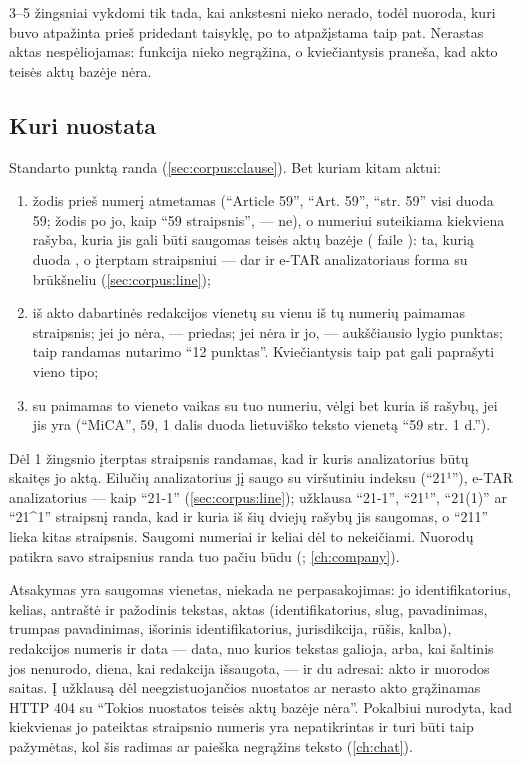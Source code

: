 3--5 žingsniai vykdomi tik tada, kai ankstesni nieko nerado, todėl nuoroda, kuri buvo
atpažinta prieš pridedant taisyklę, po to atpažįstama taip pat. Nerastas aktas nespėliojamas:
funkcija nieko negrąžina, o kviečiantysis praneša, kad akto teisės aktų bazėje nėra.

\subsection{Kuri nuostata}\label{sec:corpus:whichprovision}

Standarto punktą randa  (\cref{sec:corpus:clause}). Bet kuriam kitam aktui:

\begin{enumerate}
  \item žodis prieš numerį atmetamas (\enquote{Article 59}, \enquote{Art. 59},
    \enquote{str. 59} visi duoda 59; žodis po jo, kaip \enquote{59 straipsnis}, --- ne), o
    numeriui suteikiama kiekviena rašyba, kuria jis gali būti saugomas teisės aktų bazėje
    ( faile ): ta, kurią duoda
    , o įterptam straipsniui --- dar ir e-TAR analizatoriaus forma su
    brūkšneliu (\cref{sec:corpus:line});
  \item iš akto dabartinės redakcijos vienetų su vienu iš tų numerių paimamas straipsnis; jei jo nėra,
    --- priedas; jei nėra ir jo, --- aukščiausio lygio punktas; taip randamas nutarimo
    \enquote{12 punktas}. Kviečiantysis taip pat gali paprašyti vieno tipo;
  \item su  paimamas to vieneto vaikas su tuo numeriu, vėlgi bet kuria iš
    rašybų, jei jis yra
    (\enquote{MiCA}, 59, 1 dalis duoda lietuviško teksto vienetą \enquote{59 str. 1 d.}).
\end{enumerate}

Dėl 1 žingsnio įterptas straipsnis randamas, kad ir kuris analizatorius būtų skaitęs jo aktą.
Eilučių analizatorius jį saugo su viršutiniu indeksu (\enquote{21¹}), e-TAR analizatorius --- kaip
\enquote{21-1} (\cref{sec:corpus:line}); užklausa \enquote{21-1}, \enquote{21¹},
\enquote{21(1)} ar \enquote{21\textasciicircum 1} straipsnį randa, kad ir kuria iš šių dviejų
rašybų jis saugomas, o \enquote{211} lieka kitas straipsnis. Saugomi numeriai ir keliai dėl to
nekeičiami. Nuorodų patikra savo straipsnius randa tuo pačiu būdu (;
\cref{ch:company}).

Atsakymas yra saugomas vienetas, niekada ne perpasakojimas: jo identifikatorius, kelias,
antraštė ir pažodinis tekstas, aktas (identifikatorius, slug, pavadinimas, trumpas pavadinimas,
išorinis identifikatorius, jurisdikcija, rūšis, kalba), redakcijos numeris ir data --- data, nuo
kurios tekstas galioja, arba, kai šaltinis jos nenurodo, diena, kai redakcija išsaugota, --- ir
du adresai: akto  ir nuorodos saitas. Į užklausą dėl neegzistuojančios nuostatos ar
nerasto akto grąžinamas HTTP 404 su \enquote{Tokios nuostatos teisės aktų bazėje nėra}.
Pokalbiui nurodyta, kad kiekvienas jo pateiktas straipsnio numeris yra nepatikrintas ir turi būti taip
pažymėtas, kol šis radimas ar paieška negrąžins teksto (\cref{ch:chat}).

